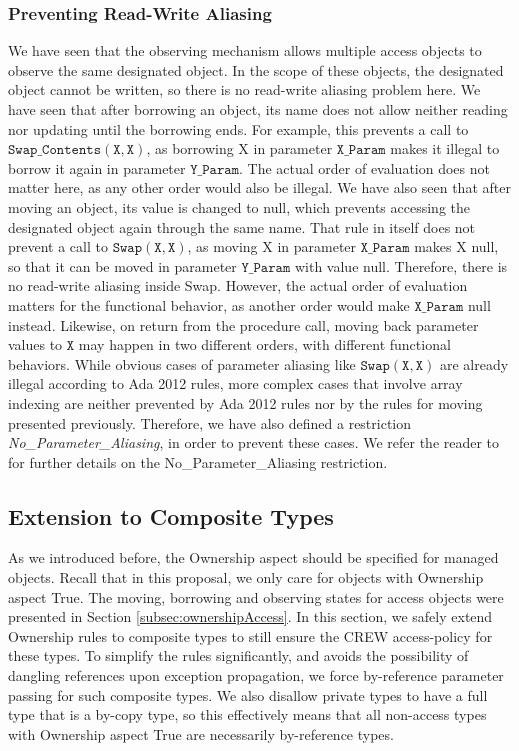 \documentclass{llncs}
\newcommand\var[1]{\ensuremath{\mathtt{#1}}}
\begin{document}
\subsubsection{Preventing Read-Write Aliasing}
\label{sec:noaliasing}
We have seen that the observing mechanism allows multiple access objects to observe the same designated object. In the scope of these objects, the designated object
cannot be written, so there is no read-write aliasing problem here.
We have seen that after borrowing an object, its name does not allow neither reading nor updating until the borrowing ends. For example, this prevents a call to \var{Swap\_Contents (X, X)},
as borrowing X in parameter \var{X\_Param} makes it illegal to borrow it again in parameter \var{Y\_Param}. The actual order of evaluation does not matter here, as any other order would also be illegal.
We have also seen that after moving an object, its value is changed to null, which prevents accessing the designated object again through the same name.
That rule in itself does not prevent a call to \var{Swap(X, X)}, as moving X in parameter \var{X\_Param} makes X null, so that it can be moved in parameter \var{Y\_Param} with value null.
Therefore, there is no read-write aliasing inside Swap. However, the actual order of evaluation matters for the functional behavior, as another order would make \var{X\_Param} null
instead. Likewise, on return from the procedure call, moving back parameter values to \var{X} may happen in two different orders, with different functional behaviors.
While obvious cases of parameter aliasing like \var{Swap(X,X)} are already illegal according to Ada 2012 rules, more complex cases that involve array indexing are neither
prevented by Ada 2012 rules nor by the rules for moving presented previously. Therefore, we have also defined a restriction \textit{No\_Parameter\_Aliasing},
in order to prevent these cases. We refer the reader to \cite{AI2017} for further details on the No\_Parameter\_Aliasing restriction.


\subsection{Extension to Composite Types} 
\label{subsec:ownershipComposite}

As we introduced before, the Ownership aspect should be specified for managed objects. Recall that in this proposal, we only care for objects with Ownership aspect True.
The moving, borrowing and observing states for access objects were presented in Section \ref{subsec:ownershipAccess}. In this section, we safely extend Ownership rules to
composite types to still ensure the CREW access-policy for these types. To simplify the rules significantly, and avoids the possibility of dangling references upon exception
propagation, we force by-reference parameter passing for such composite types.  We also disallow private types to have a full type that is a by-copy type, so this effectively
means that all non-access types with Ownership aspect True are necessarily by-reference types. 
\end{document}
